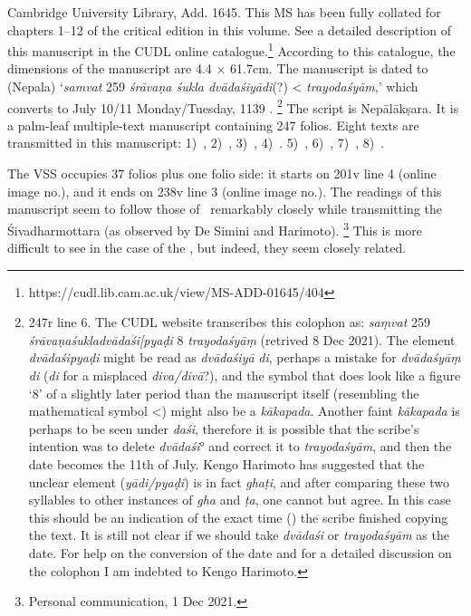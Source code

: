 Cambridge University Library, Add. 1645. This MS has been fully
collated for chapters 1--12 of the critical edition in this volume. 
See a detailed description of this manuscript in the CUDL online catalogue.\footnote{https://cudl.lib.cam.ac.uk/view/MS-ADD-01645/404}
According to this catalogue, the dimensions of the manuscript are 
4.4 × 61.7cm. The manuscript is dated to (Nepala) `\emph{samvat} 259
\emph{śrāvaṇa śukla dvādaśiyādi}(?) \textless{} \emph{trayodaśyām},'
which converts to July 10/11 Monday/Tuesday, 1139 \CE.%
		 \footnote{\Fol247r line 6. The CUDL website transcribes this
		  colophon as: \emph{saṃvat} 259 
		  \emph{śrāvaṇaśukladvādaśi{\rm[}pyaḍi} 8 
		  \emph{trayodaśyāṃ} (retrived 8 Dec 2021). 
		  The element \emph{dvādaśipyaḍi} might be read as
		  \emph{dvādaśiyā} \emph{di}, perhaps a mistake for
		   \emph{dvādaśyāṃ}
		  \emph{di} (\emph{di} for a misplaced \emph{diva/divā}?), and the
		  symbol that does look like a figure `8' of a slightly later period
		  than the manuscript itself (resembling the mathematical symbol
		  \textless{}) might also be a \emph{kākapada}. Another faint
		  \emph{kākapada} is perhaps to be seen under \emph{daśi},
		  therefore it is possible that the scribe's intention was to delete 	
		  \emph{dvādaśi}° and correct it to \emph{trayodaśyām}, 
		  and then the date becomes the 11th of July. Kengo Harimoto 
		  has suggested that the unclear element
		  (\emph{yādi/pyaḍi}) is in fact \emph{ghaṭi}, 
		  and after comparing these two syllables to other instances of
		   \emph{gha} and \emph{ṭa}, one cannot but agree. 
		   In this case this should be an indication of the
		  exact time () 
		  the scribe finished copying the text. It is still not clear
		  if we should take \emph{dvādaśi} or \emph{trayodaśyām} 
		  as the date. For help on the conversion of the date and 
		  for a detailed discussion on the colophon I am indebted
		  to Kengo Harimoto.} 
The script is Nepālā\-kṣara. It is a palm-leaf multiple-text manuscript containing 247 folios. Eight texts are transmitted in this manuscript: 
1)~,
2)~, 
3)~, 
4)~.
5)~, 
6)~, 
7)~,
8)~.


The VSS occupies 37 folios plus one folio side: it starts on \fol201v
line 4 (online image no.), 
and it ends on \fol238v line 3 (online image
no.). 
The readings of this manuscript seem to follow those of \msNa\
remarkably closely while transmitting the 
Śivadharmottara (as observed by De Simini and Harimoto).%
\footnote{Personal communication, 1 Dec 2021.} This
is more difficult to see in the case of the \VSS, 
but indeed, they seem closely related. 


